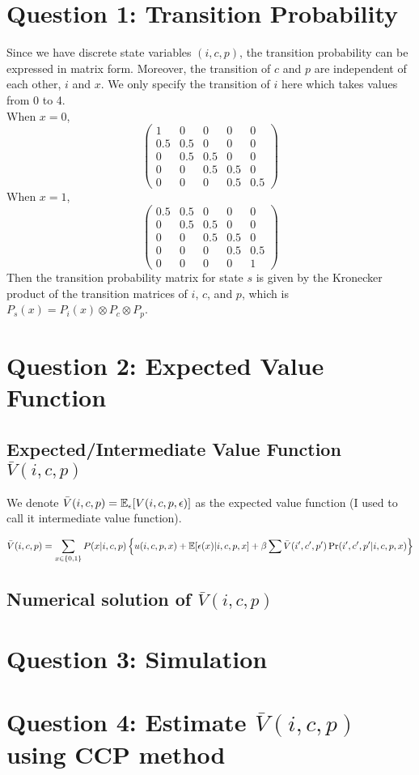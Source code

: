 \documentclass[12pt]{article}[margin=1in]
\begin{document}
\section{Question 1: Transition Probability}
Since we have discrete state variables $(i,c,p)$, the transition probability
can be expressed in matrix form. Moreover, the transition of $c$ and $p$ are
independent of each other, $i$ and $x$. We only specify the transition of $i$
here which takes values from 0 to 4. \\ When $x = 0$,
\begin{equation*}
    \begin{pmatrix}
        1   & 0   & 0   & 0   & 0   \\
        0.5 & 0.5 & 0   & 0   & 0   \\
        0   & 0.5 & 0.5 & 0   & 0   \\
        0   & 0   & 0.5 & 0.5 & 0   \\
        0   & 0   & 0   & 0.5 & 0.5
    \end{pmatrix}
\end{equation*}
When $x = 1$,
\begin{equation*}
    \begin{pmatrix}
        0.5 & 0.5 & 0   & 0   & 0   \\
        0   & 0.5 & 0.5 & 0   & 0   \\
        0   & 0   & 0.5 & 0.5 & 0   \\
        0   & 0   & 0   & 0.5 & 0.5 \\
        0   & 0   & 0   & 0   & 1
    \end{pmatrix}
\end{equation*}
Then the transition probability matrix for state $s$ is given by the Kronecker product of the transition matrices of $i$, $c$, and $p$, which is $P_s(x) = P_i(x) \otimes P_c \otimes P_p$.
\section{Question 2: Expected Value Function}
\subsection{Expected/Intermediate Value Function $\bar{V}(i,c,p)$}
We denote $\bar{V}(i,c,p) = \mathbb{E}_{\epsilon}[V(i,c,p,\epsilon)]$ as the expected value function (I used to call it intermediate value function).

\begin{equation*}
    \bar{V}(i,c,p) =\sum_{x \in \{0,1\}} P(x|i,c,p) \left\{ u(i,c,p,x) + \mathbb{E}[\epsilon(x)|i,c,p,x] + \beta \sum \bar{V}(i',c',p') \Pr(i',c',p'|i,c,p,x) \right\}
\end{equation*}
\subsection{Numerical solution of $\bar{V}(i,c,p)$}

\section{Question 3: Simulation}
\section{Question 4: Estimate $\bar{V}(i,c,p)$ using CCP method}
\pagebreak
\newpage
\end{document}
